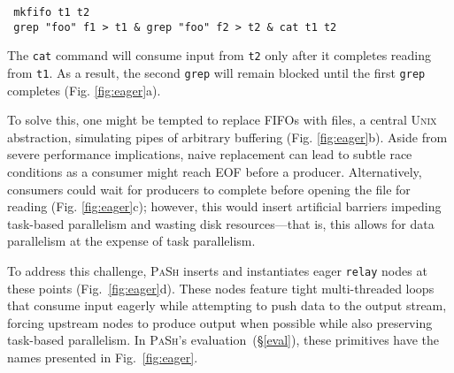 \documentclass[sigplan, review, screen, anonymous]{acmart}
\newcommand{\ttt}[1]{\texttt{#1}}
\newcommand{\sx}[1]{(\S\ref{#1})}
\newcommand{\sys}{{\scshape PaSh}\xspace}
\newcommand{\unix}{{\scshape Unix}\xspace}
\begin{document}
\begin{verbatim}
 mkfifo t1 t2
 grep "foo" f1 > t1 & grep "foo" f2 > t2 & cat t1 t2
\end{verbatim}

\noindent
The \ttt{cat} command will consume input from \ttt{t2} only after it completes reading from \ttt{t1}.
As a result, the second \ttt{grep} will remain blocked until the first \ttt{grep} completes (Fig. \ref{fig:eager}a). %

To solve this, one might be tempted to replace FIFOs with files, a central \unix abstraction, simulating pipes of arbitrary buffering (Fig. \ref{fig:eager}b).
Aside from severe performance implications, naive replacement can lead to subtle race conditions as a consumer might reach {\sc EOF} before a producer.
Alternatively, consumers could wait for producers to complete before opening the file for reading (Fig. \ref{fig:eager}c);
  however, this would insert artificial barriers impeding task-based parallelism and wasting disk resources---that is, this allows for data parallelism at the expense of task parallelism.

To address this challenge,
  \sys inserts and instantiates eager \ttt{relay} nodes at these points (Fig.~\ref{fig:eager}d). %
These nodes feature tight multi-threaded loops that consume input eagerly while attempting to push data to the output stream, forcing upstream nodes to produce output when possible while also preserving task-based parallelism.
In \sys's evaluation~\sx{eval}, these primitives have the names presented in Fig.~\ref{fig:eager}.
\end{document}
